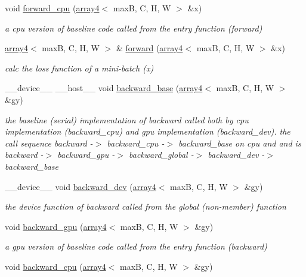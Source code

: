 \begin{DoxyCompactItemize}
void \hyperlink{structRelu_a767ca23ba58264771274f2e5e51ae4ce}{forward\+\_\+cpu} (\hyperlink{structarray4}{array4}$<$ maxB, C, H, W $>$ \&x)
\begin{DoxyCompactList}\small\item\em a cpu version of baseline code called from the entry function (forward) \end{DoxyCompactList}\item 
\hyperlink{structarray4}{array4}$<$ maxB, C, H, W $>$ \& \hyperlink{structRelu_a71f8322b10508a210025151ad788226f}{forward} (\hyperlink{structarray4}{array4}$<$ maxB, C, H, W $>$ \&x)
\begin{DoxyCompactList}\small\item\em calc the loss function of a mini-\/batch (x) \end{DoxyCompactList}\item 
\+\_\+\+\_\+device\+\_\+\+\_\+ \+\_\+\+\_\+host\+\_\+\+\_\+ void \hyperlink{structRelu_ad2da72c21984db8c9cec57c6d60bf741}{backward\+\_\+base} (\hyperlink{structarray4}{array4}$<$ maxB, C, H, W $>$ \&gy)
\begin{DoxyCompactList}\small\item\em the baseline (serial) implementation of backward called both by cpu implementation (backward\+\_\+cpu) and gpu implementation (backward\+\_\+dev). the call sequence backward -\/$>$ backward\+\_\+cpu -\/$>$ backward\+\_\+base on cpu and and is backward -\/$>$ backward\+\_\+gpu -\/$>$ backward\+\_\+global -\/$>$ backward\+\_\+dev -\/$>$ backward\+\_\+base \end{DoxyCompactList}\item 
\+\_\+\+\_\+device\+\_\+\+\_\+ void \hyperlink{structRelu_a0b13992d8093aa08ed9036cac3a5437b}{backward\+\_\+dev} (\hyperlink{structarray4}{array4}$<$ maxB, C, H, W $>$ \&gy)
\begin{DoxyCompactList}\small\item\em the device function of backward called from the global (non-\/member) function \end{DoxyCompactList}\item 
void \hyperlink{structRelu_a15ee109a34e8ad3c94c0b42c05647342}{backward\+\_\+gpu} (\hyperlink{structarray4}{array4}$<$ maxB, C, H, W $>$ \&gy)
\begin{DoxyCompactList}\small\item\em a gpu version of baseline code called from the entry function (backward) \end{DoxyCompactList}\item 
void \hyperlink{structRelu_aa2112a7ad1cb1faea9babc90835a84c5}{backward\+\_\+cpu} (\hyperlink{structarray4}{array4}$<$ maxB, C, H, W $>$ \&gy)

\end{DoxyCompactItemize}
